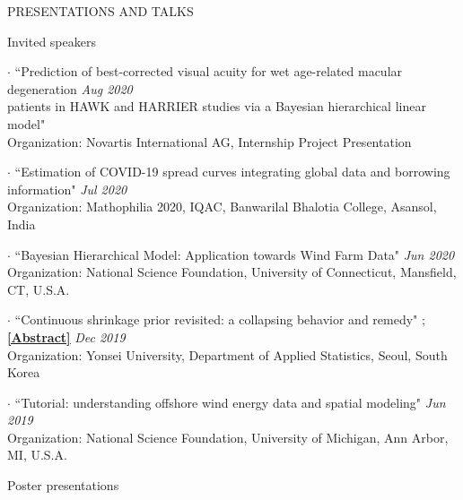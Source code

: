 \documentclass{resume} %
\begin{document}
\begin{rSection}{PRESENTATIONS AND TALKS}
\begin{rSubsection}{Invited speakers}{}{}{}
\item[$\cdot$]
{``Prediction of best-corrected visual acuity for wet age-related macular degeneration}  \hfill {\em Aug 2020}
\\
{ patients in HAWK and HARRIER studies via a Bayesian hierarchical linear model"}
\\
Organization: Novartis International AG, Internship Project Presentation

\item[$\cdot$]
{``Estimation of COVID-19 spread curves integrating global data and borrowing  information"}  \hfill {\em Jul 2020}
\\
Organization: Mathophilia 2020, IQAC, Banwarilal Bhalotia College, Asansol, India


\item[$\cdot$]
{``Bayesian Hierarchical Model: Application towards Wind
Farm Data"}  \hfill {\em Jun 2020}
\\
Organization: National Science Foundation, University of Connecticut, Mansfield, CT, U.S.A.

\item[$\cdot$]
{``Continuous shrinkage prior revisited: a collapsing behavior and remedy"}  
;
\href{https://stat.yonsei.ac.kr/stat/board/grad_notice.do?mode=view&articleNo=76831&article.offset=0&articleLimit=10}
{\underline{\textbf{[Abstract]}}}
\hfill {\em Dec 2019}
\\
Organization: Yonsei University, Department of Applied Statistics, Seoul, South Korea


\item[$\cdot$]
{``Tutorial: understanding offshore wind energy data and spatial modeling"}  \hfill {\em Jun 2019}
\\
Organization: National Science Foundation, University of Michigan, Ann Arbor, MI, U.S.A.
\end{rSubsection}
\begin{rSubsection}{Poster presentations}{}{}{}


\end{rSubsection}
\end{rSection}
\end{document}
